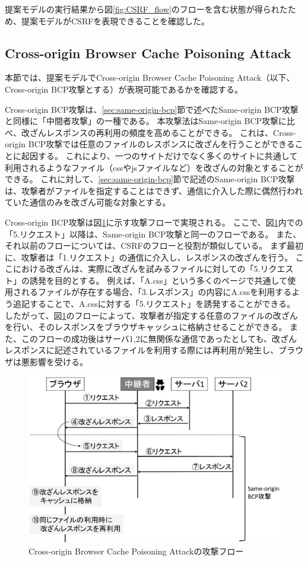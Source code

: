 \documentclass[journal]{IEEEtran}
\begin{document}
提案モデルの実行結果から図\ref{fig:CSRF_flow}のフローを含む状態が得られたため、提案モデルがCSRFを表現できることを確認した。

\subsection{Cross-origin Browser Cache Poisoning Attack}
本節では、提案モデルでCross-origin Browser Cache Poisoning Attack\cite{bcpattack}（以下、Cross-origin BCP攻撃とする）が表現可能であるかを確認する。

Cross-origin BCP攻撃は、\ref{sec:same-origin-bcp}節で述べたSame-origin BCP攻撃と同様に「中間者攻撃」の一種である。
本攻撃法はSame-origin BCP攻撃に比べ、改ざんレスポンスの再利用の頻度を高めることができる。
これは、Cross-origin BCP攻撃では任意のファイルのレスポンスに改ざんを行うことができることに起因する。
これにより、一つのサイトだけでなく多くのサイトに共通して利用されるようなファイル（cssやjsファイルなど）を改ざんの対象とすることができる。
これに対して、\ref{sec:same-origin-bcp}節で記述のSame-origin BCP攻撃は、攻撃者がファイルを指定することはできず、通信に介入した際に偶然行われていた通信のみを改ざん可能な対象とする。

Cross-origin BCP攻撃は図\ref{fig:CrossBCP_flow}に示す攻撃フローで実現される。
ここで、図\ref{fig:CrossBCP_flow}内での「5.リクエスト」以降は、Same-origin BCP攻撃と同一のフローである。
また、それ以前のフローについては、CSRFのフローと役割が類似している。
まず最初に、攻撃者は「1.リクエスト」の通信に介入し、レスポンスの改ざんを行う。
ここにおける改ざんは、実際に改ざんを試みるファイルに対しての「5.リクエスト」の誘発を目的とする。
例えば、「A.css」という多くのページで共通して使用されるファイルが存在する場合、「3.レスポンス」の内容にA.cssを利用するよう追記することで、A.cssに対する「5.リクエスト」を誘発することができる。
したがって、図\ref{fig:CrossBCP_flow}のフローによって、攻撃者が指定する任意のファイルの改ざんを行い、そのレスポンスをブラウザキャッシュに格納させることができる。
また、このフローの成功後はサーバ1,2に無関係な通信であったとしても、改ざんレスポンスに記述されているファイルを利用する際には再利用が発生し、ブラウザは悪影響を受ける。

\begin{figure}[htb]
\centering
\includegraphics[width=\hsize]{./fig/CrossBCP_flow.eps}
\caption{Cross-origin Browser Cache Poisoning Attackの攻撃フロー}
\label{fig:CrossBCP_flow}
\end{figure}
\end{document}
